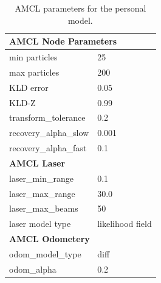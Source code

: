 \documentclass[10pt,journal,compsoc]{IEEEtran}
\begin{document}
\begin{table}[ht]
\caption{AMCL parameters for the personal model.}
\label{tab:AMCLparam-Tankbot}
\begin{center}
    \begin{tabular}{ll}
        \toprule%
    \multicolumn{2}{l}{\textbf{AMCL Node Parameters}} \\
    \midrule
    min particles              & 25                   \\
    max particles              & 200                  \\
    KLD error                  & 0.05                  \\
    KLD-Z                      & 0.99                 \\
    transform\_tolerance       & 0.2                  \\
    recovery\_alpha\_slow      & 0.001                \\
    recovery\_alpha\_fast      & 0.1                  \\
    \midrule
    \multicolumn{2}{l}{\textbf{AMCL Laser}}           \\
    \midrule
    laser\_min\_range          & 0.1                  \\
    laser\_max\_range          & 30.0                 \\
    laser\_max\_beams          & 50                   \\
    laser model type           & likelihood field     \\
    \midrule
    \multicolumn{2}{l}{\textbf{AMCL Odometery}}       \\
    \midrule
    odom\_model\_type          & diff                 \\
    odom\_alpha                & 0.2                   \\
    \bottomrule
    \end{tabular}
\end{center}
\end{table}
\end{document}
